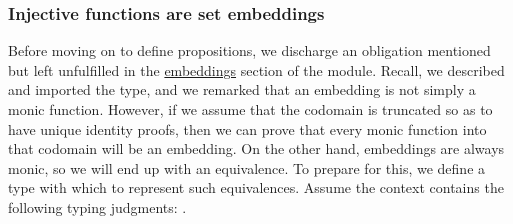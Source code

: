 \subsubsection{Injective functions are set embeddings}\label{injective-functions-are-set-embeddings}
Before moving on to define propositions, we discharge an obligation mentioned but left unfulfilled in the
\href{https://ualib.gitlab.io/Overture.Inverses.html\#embeddings}{embeddings} section of the  module. Recall, we described and imported the  type, and we remarked that an embedding is not simply a monic function. However, if we assume that the codomain is truncated so as to have unique identity proofs, then we can prove that every monic function into that codomain will be an embedding. On the other hand, embeddings are always monic, so we will end up with an equivalence. To prepare for this, we define a type
 with which to represent such equivalences. Assume the context contains the following typing judgments: \AgdaSymbol{\{}\AgdaSpace{}\AgdaSpace{}%
\AgdaSymbol{:}\AgdaSpace{}%
\AgdaSymbol{\}\{}\AgdaSpace{}%
\AgdaSymbol{:}\AgdaSpace{}%
\AgdaSpace{}%
\AgdaSymbol{\}\{}\AgdaSpace{}%
\AgdaSymbol{:}\AgdaSpace{}%
\AgdaSpace{}%
\AgdaSymbol{\}}.
\ccpad
\begin{code}%
\>[0]\AgdaSpace{}%
\AgdaSymbol{:}\AgdaSpace{}%
\AgdaSpace{}%
\AgdaSpace{}%
\AgdaSpace{}%
\AgdaSpace{}%
\AgdaSpace{}%
\AgdaSpace{}%
\AgdaSpace{}%
\AgdaSpace{}%
\AgdaSpace{}%
\<%
\\
\>[0]\AgdaSpace{}%
\AgdaSpace{}%
\AgdaSpace{}%
\AgdaSymbol{=}\AgdaSpace{}%
\AgdaSymbol{(}\AgdaSpace{}%
\AgdaSpace{}%
\AgdaSymbol{)}\AgdaSpace{}%
\AgdaSpace{}%
\AgdaSymbol{(}\AgdaSpace{}%
\AgdaSpace{}%
\AgdaSymbol{)}\<%
\end{code}
